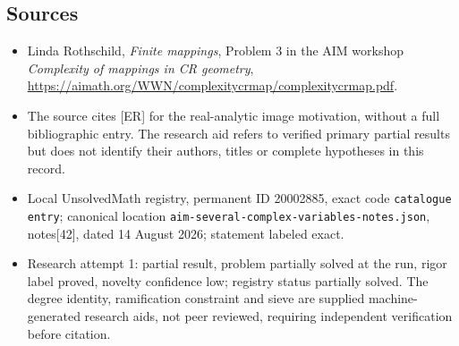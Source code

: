 \documentclass[11pt]{article}
\begin{document}
\subsection{Sources}
\begin{itemize}
\item Linda Rothschild, \emph{Finite mappings}, Problem 3 in the AIM workshop \emph{Complexity of mappings in CR geometry}, \url{https://aimath.org/WWN/complexitycrmap/complexitycrmap.pdf}.
\item The source cites [ER] for the real-analytic image motivation, without a full bibliographic entry. The research aid refers to verified primary partial results but does not identify their authors, titles or complete hypotheses in this record.
\item Local UnsolvedMath registry, permanent ID 20002885, exact code \texttt{catalogue entry}; canonical location \texttt{aim-several-complex-variables-notes.json}, notes[42], dated 14 August 2026; statement labeled exact.
\item Research attempt 1: partial result, problem partially solved at the run, rigor label proved, novelty confidence low; registry status partially solved. The degree identity, ramification constraint and sieve are supplied machine-generated research aids, not peer reviewed, requiring independent verification before citation.
\end{itemize}
\end{document}
